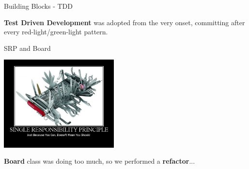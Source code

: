 \documentclass{beamer}
\begin{document}
\begin{frame}{Building Blocks - TDD}

\begin{centering}


\end{centering}

\vspace{1em}

\textbf{Test Driven Development} was adopted from the very onset, committing after every red-light/green-light pattern.

\end{frame}



\begin{frame}{SRP and Board}

\includegraphics[width=0.45\textwidth]{img/singleresponsibilityprinciple.jpg}

\vspace{3em}

\textbf{Board} class was doing too much, so we performed a \textbf{refactor}...

\end{frame}
\end{document}
